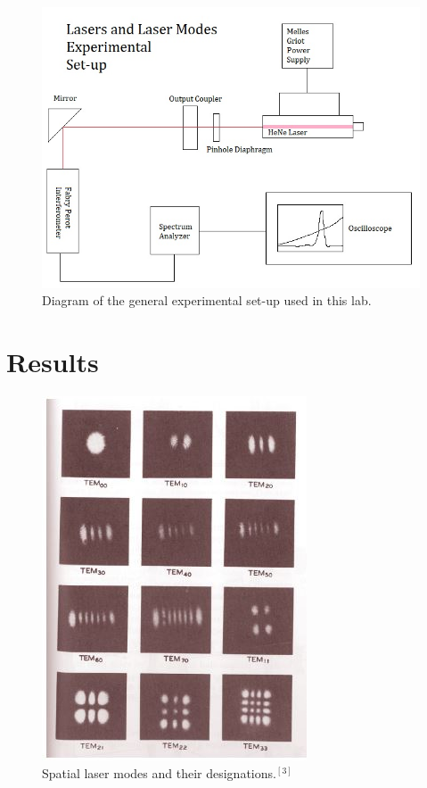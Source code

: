 \documentclass{article}
\begin{document}
\begin{figure}[H]
\includegraphics[scale=0.6,center]{LaserSetup.jpg}
\caption{Diagram of the general experimental set-up used in this lab.}
\end{figure}

\newpage 

\section{Results}

\begin{figure}
  \includegraphics[scale=0.6]{LaserModesChart.JPG}
  \caption{Spatial laser modes and their designations.$^{[3]}$}
\end{figure}
\end{document}
